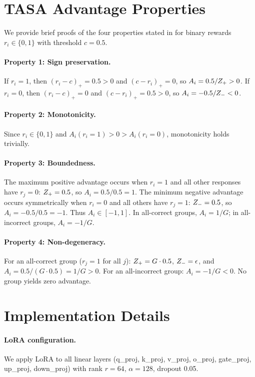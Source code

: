 \section{TASA Advantage Properties}
\label{app:tasa_properties}

We provide brief proofs of the four properties stated in  for binary rewards $r_i \in \{0, 1\}$ with threshold $c = 0.5$.

\paragraph{Property 1: Sign preservation.}
If $r_i = 1$, then $(r_i - c)_+ = 0.5 > 0$ and $(c - r_i)_+ = 0$, so $A_i = 0.5/Z_{+} > 0$.
If $r_i = 0$, then $(r_i - c)_+ = 0$ and $(c - r_i)_+ = 0.5 > 0$, so $A_i = -0.5/Z_{-} < 0$.

\paragraph{Property 2: Monotonicity.}
Since $r_i \in \{0, 1\}$ and $A_i(r_i{=}1) > 0 > A_i(r_i{=}0)$, monotonicity holds trivially.

\paragraph{Property 3: Boundedness.}
The maximum positive advantage occurs when $r_i = 1$ and all other responses have $r_j = 0$: $Z_{+} = 0.5$, so $A_i = 0.5/0.5 = 1$.
The minimum negative advantage occurs symmetrically when $r_i = 0$ and all others have $r_j = 1$: $Z_{-} = 0.5$, so $A_i = -0.5/0.5 = -1$.
Thus $A_i \in [-1, 1]$.
In all-correct groups, $A_i = 1/G$; in all-incorrect groups, $A_i = -1/G$.

\paragraph{Property 4: Non-degeneracy.}
For an all-correct group ($r_j = 1$ for all $j$): $Z_{+} = G \cdot 0.5$, $Z_{-} = \epsilon$, and $A_i = 0.5 / (G \cdot 0.5) = 1/G > 0$. For an all-incorrect group: $A_i = -1/G < 0$. No group yields zero advantage.

\section{Implementation Details}
\label{app:impl}

\paragraph{LoRA configuration.}
We apply LoRA to all linear layers (q\_proj, k\_proj, v\_proj, o\_proj, gate\_proj, up\_proj, down\_proj) with rank $r{=}64$, $\alpha{=}128$, dropout 0.05.

